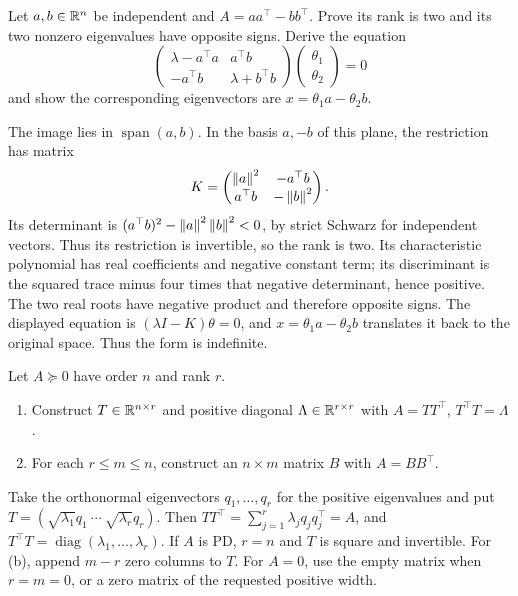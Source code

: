 \begin{problem}\label{ex:09:rank-two-minus}
Let \(a,b\in\mathbb R^n\) be independent and \(A=aa^\top-bb^\top\).
Prove its rank is two and its two nonzero eigenvalues have opposite signs.
Derive the equation
\[
 \begin{pmatrix}\lambda-a^\top a&a^\top b\\
                 -a^\top b&\lambda+b^\top b\end{pmatrix}
 \begin{pmatrix}\theta_1\\\theta_2\end{pmatrix}=0
\]
and show the corresponding eigenvectors are \(x=\theta_1a-\theta_2b\).
\end{problem}
\begin{solution}
The image lies in \(\operatorname{span}(a,b)\).
In the basis \(a,-b\) of this plane, the restriction has matrix
\[
 K=\begin{pmatrix}\left\lVert a\right\rVert^2&-a^\top b\\
                  a^\top b&-\left\lVert b\right\rVert^2\end{pmatrix}.
\]
Its determinant is
\((a^\top b)^2-\left\lVert a\right\rVert^2\left\lVert b\right\rVert^2<0\), by strict Schwarz for independent
vectors. Thus its restriction is invertible, so the rank is two.
Its characteristic polynomial has real coefficients and negative
constant term; its discriminant is the squared trace minus four times
that negative determinant, hence positive. The two real roots have
negative product and therefore opposite signs.
The displayed equation is \((\lambda I-K)\theta=0\), and
\(x=\theta_1a-\theta_2b\) translates it back to the original space.
Thus the form is indefinite.
\end{solution}

\begin{problem}\label{ex:09:psd-factor}
Let \(A\succeq0\) have order \(n\) and rank \(r\).
\begin{enumerate}
\item Construct \(T\in\mathbb R^{n\times r}\) and positive diagonal
\(\Lambda\in\mathbb R^{r\times r}\) with \(A=TT^\top\), \(T^\top T=\Lambda\).
\item For each \(r\leqslant m\leqslant n\), construct an \(n\times m\)
matrix \(B\) with \(A=BB^\top\).
\end{enumerate}
\end{problem}
\begin{solution}
Take the orthonormal eigenvectors \(q_1,\ldots,q_r\) for the positive
eigenvalues and put
\(T=(\sqrt{\lambda_1}q_1\ \cdots\ \sqrt{\lambda_r}q_r)\).
Then \(TT^\top=\sum_{j=1}^r\lambda_jq_jq_j^\top=A\), and
\(T^\top T=\operatorname{diag}(\lambda_1,\ldots,\lambda_r)\).
If \(A\) is PD, \(r=n\) and \(T\) is square and invertible.
For (b), append \(m-r\) zero columns to \(T\).
For \(A=0\), use the empty matrix when \(r=m=0\), or a zero matrix
of the requested positive width.
\end{solution}

